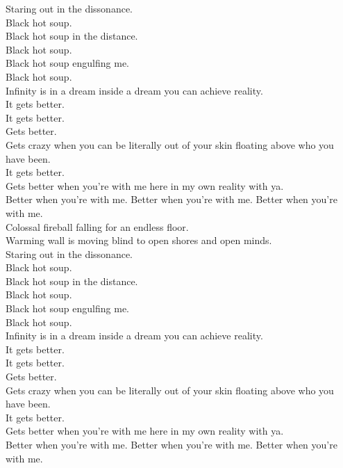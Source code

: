 Staring out in the dissonance. \\
Black hot soup. \\
Black hot soup in the distance. \\
Black hot soup. \\
Black hot soup engulfing me. \\
Black hot soup. \\

Infinity is in a dream inside a dream you can achieve reality. \\
It gets better. \\
It gets better. \\
Gets better. \\
Gets crazy when you can be literally out of your skin floating above who you have been. \\
It gets better. \\
Gets better when you're with me here in my own reality with ya. \\
Better when you're with me. Better when you're with me. Better when you're with me. \\

Colossal fireball falling for an endless floor. \\
Warming wall is moving blind to open shores and open minds. \\

Staring out in the dissonance. \\
Black hot soup. \\
Black hot soup in the distance. \\
Black hot soup. \\
Black hot soup engulfing me. \\
Black hot soup. \\

Infinity is in a dream inside a dream you can achieve reality. \\
It gets better. \\
It gets better. \\
Gets better. \\
Gets crazy when you can be literally out of your skin floating above who you have been. \\
It gets better. \\
Gets better when you're with me here in my own reality with ya. \\
Better when you're with me. Better when you're with me. Better when you're with me. \\

